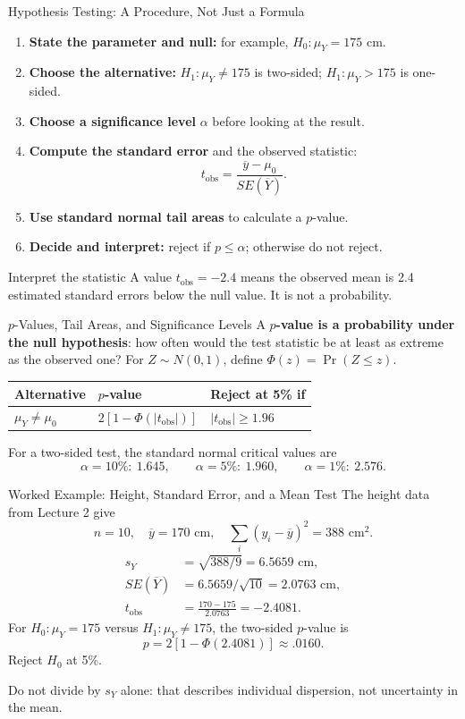 \documentclass[10pt,aspectratio=169]{beamer}
\newcommand{\Prb}{\operatorname{Pr}}
\begin{document}
\begin{frame}{Hypothesis Testing: A Procedure, Not Just a Formula}
\begin{enumerate}
\item \textbf{State the parameter and null:} for example, $H_0:\mu_Y=175$ cm.
\item \textbf{Choose the alternative:} $H_1:\mu_Y\neq175$ is two-sided; $H_1:\mu_Y>175$ is one-sided.
\item \textbf{Choose a significance level} $\alpha$ before looking at the result.
\item \textbf{Compute the standard error} and the observed statistic:
\[
t_{\mathrm{obs}}=\frac{\overline y-\mu_0}{SE(\overline Y)}.
\]
\item \textbf{Use standard normal tail areas} to calculate a $p$-value.
\item \textbf{Decide and interpret:} reject if $p\leq\alpha$; otherwise do not reject.
\end{enumerate}
\begin{block}{Interpret the statistic}
A value $t_{\mathrm{obs}}=-2.4$ means the observed mean is 2.4 estimated standard errors below the null value. It is not a probability.
\end{block}
\end{frame}

\begin{frame}{$p$-Values, Tail Areas, and Significance Levels}
\small
A \textbf{$p$-value is a probability under the null hypothesis}: how often would the test statistic be at least as extreme as the observed one?
For $Z\sim N(0,1)$, define $\Phi(z)=\Prb(Z\leq z)$.
\begin{center}
\begin{tabular}{lll}
\toprule
Alternative & $p$-value & Reject at 5\% if\\
\midrule
$\mu_Y\neq\mu_0$ & $2[1-\Phi(|t_{\mathrm{obs}}|)]$ & $|t_{\mathrm{obs}}|\geq1.96$\\
\bottomrule
\end{tabular}
\end{center}
For a two-sided test, the standard normal critical values are
\[
\alpha=10\%:\ 1.645,\qquad
\alpha=5\%:\ 1.960,\qquad
\alpha=1\%:\ 2.576.
\]
\end{frame}

\begin{frame}{Worked Example: Height, Standard Error, and a Mean Test}
\small
The height data from Lecture 2 give
\[
n=10,\quad \overline y=170\text{ cm},\quad
\sum_i(y_i-\overline y)^2=388\text{ cm}^2.
\]
\begin{align*}
s_Y&=\sqrt{388/9}=6.5659\text{ cm},\\
SE(\overline Y)&=6.5659/\sqrt{10}=2.0763\text{ cm},\\
t_{\mathrm{obs}}&=\frac{170-175}{2.0763}=-2.4081.
\end{align*}
For $H_0:\mu_Y=175$ versus $H_1:\mu_Y\neq175$, the two-sided $p$-value is
\[
p=2[1-\Phi(2.4081)]\approx .0160.
\]
Reject $H_0$ at 5\%.
\par\medskip
Do not divide by $s_Y$ alone: that describes individual dispersion, not uncertainty in the mean.
\end{frame}
\end{document}
